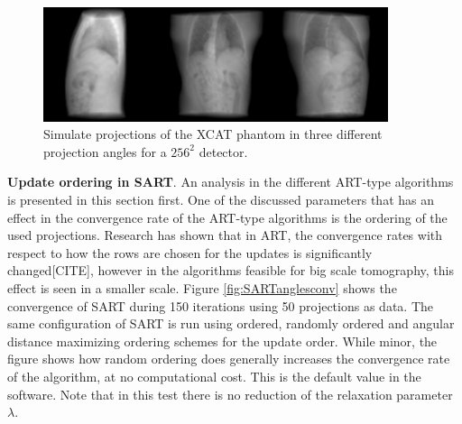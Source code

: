 \begin{figure}[h]
\begin{center}

\includegraphics[width=0.9\textwidth]{Applications/XCATproj.png} 
\end{center}

\caption[Simulate projections of the XCAT phantom]{\label{fig:XCATproj} Simulate projections of the XCAT phantom in three different projection angles for a $256^2$ detector.} 
\end{figure}

\textbf{Update ordering in SART}. An analysis in the different ART-type algorithms is presented in this section first. One of the discussed parameters that has an effect in the convergence rate of the ART-type algorithms is the ordering of the used projections. Research has shown that in ART, the convergence rates with respect to how the rows are chosen for the updates is significantly changed[CITE], however in the algorithms feasible for big scale tomography, this effect is seen in a smaller scale. Figure \ref{fig:SARTanglesconv} shows the convergence of SART during 150 iterations using 50 projections as data. The same configuration of SART is run using ordered, randomly ordered and angular distance maximizing ordering schemes for the update order. While minor, the figure shows how random ordering does generally increases the convergence rate of the algorithm, at no computational cost. This is the default value in the software. Note that in this test there is no reduction of the relaxation parameter $\lambda$.


